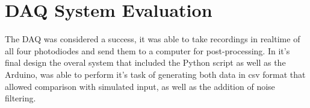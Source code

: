 \section{\acf{DAQ} System Evaluation}
The \ac{DAQ} was considered a success, it was able to take recordings in realtime of all four photodiodes and send them to a computer for post-processing. In it's final design the overal system that included the Python script as well as the Arduino, was able to perform it's task of generating both data in csv format that allowed comparison with simulated input, as well as the addition of noise filtering. 



%         





